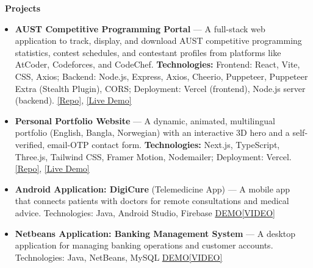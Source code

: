 \documentclass[letterpaper,10.5pt]{article}
\newcommand{\cvsection}[2]{%
  \vspace{2pt}
  \begin{tcolorbox}[
      enhanced, colback=accentSoft, colframe=accentSoft,
      boxrule=0pt, arc=3pt, left=8pt, right=8pt, top=1.5pt, bottom=1.5pt,
      before skip=0pt, after skip=3pt
    ]
    {\color{accentDark}\faIcon{#1}~\sffamily\bfseries #2}
  \end{tcolorbox}
}
\newcommand{\resumeItem}[1]{\item\small{#1\vspace{-2pt}}}
\newcommand{\resumeSubHeadingListStart}{\begin{itemize}[leftmargin=0.15in, label={}]}
\newcommand{\resumeSubHeadingListEnd}{\end{itemize}}
\begin{document}
\newpage
\cvsection{folder-open}{Projects}
\resumeSubHeadingListStart
  \resumeItem{\textbf{\color{accentDark}AUST Competitive Programming Portal} --- A full-stack web application to track, display, and download AUST competitive programming statistics, contest schedules, and contestant profiles from platforms like AtCoder, Codeforces, and CodeChef. \textbf{Technologies:} Frontend: React, Vite, CSS, Axios; Backend: Node.js, Express, Axios, Cheerio, Puppeteer, Puppeteer Extra (Stealth Plugin), CORS; Deployment: Vercel (frontend), Node.js server (backend). \href{https://github.com/ApuOrgho/aust-cp-standings-frontend}{\textcolor{accent}{\underline{[Repo]}}}, \href{https://cp-standings.apuorgho.com}{\textcolor{accent}{\underline{[Live Demo]}}}}
  \resumeItem{\textbf{\color{accentDark}Personal Portfolio Website} --- A dynamic, animated, multilingual portfolio (English, Bangla, Norwegian) with an interactive 3D hero and a self-verified, email-OTP contact form. \textbf{Technologies:} Next.js, TypeScript, Three.js, Tailwind CSS, Framer Motion, Nodemailer; Deployment: Vercel. \href{https://github.com/ApuOrgho/portfolio}{\textcolor{accent}{\underline{[Repo]}}}, \href{https://apuorgho.com}{\textcolor{accent}{\underline{[Live Demo]}}}}
  \resumeItem{\textbf{\color{accentDark}Android Application: DigiCure} (Telemedicine App) --- A mobile app that connects patients with doctors for remote consultations and medical advice. Technologies: Java, Android Studio, Firebase \href{https://apuorgho.com/videos/digicure.mp4}{\textcolor{accent}{\underline{DEMO[VIDEO]}}}}
  \resumeItem{\textbf{\color{accentDark}Netbeans Application: Banking Management System} --- A desktop application for managing banking operations and customer accounts. Technologies: Java, NetBeans, MySQL \href{https://apuorgho.com/videos/banking_management.mp4}{\textcolor{accent}{\underline{DEMO[VIDEO]}}}}
\resumeSubHeadingListEnd
\end{document}
